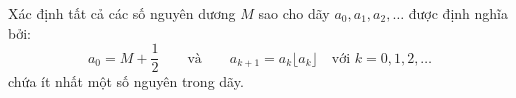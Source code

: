 \ifshowproblem
\begin{problem}\label{example:IMO-2015-SL-P1}
    Xác định tất cả các số nguyên dương \( M \) sao cho dãy \( a_0, a_1, a_2, \ldots \) được định nghĩa bởi:
    \[
        a_0 = M + \frac{1}{2} \qquad \text{và} \qquad a_{k+1} = a_k \lfloor a_k \rfloor \quad \text{với } k = 0, 1, 2, \ldots
    \]
    chứa ít nhất một số nguyên trong dãy.    
\end{problem}
\fi

\footnotemark
{}
\fi
